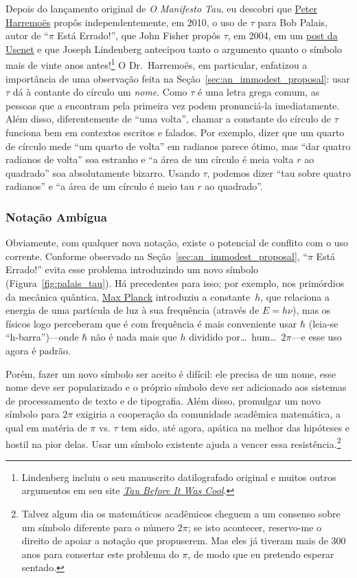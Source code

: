 Depois do lançamento original de \emph{O Manifesto Tau}, eu descobri que \href{http://www.harremoes.dk/Peter/}{Peter Harremo\"{e}s} propôs independentemente, em 2010, o uso de $\tau$ para Bob Palais, autor de ``$\pi$ Está Errado!'', que John Fisher propôs $\tau$, em 2004, em um \href{https://groups.google.com/forum/#!msg/sci.math/c-DHmJHSA0A/sLCoOtHB1UAJ}{post da Usenet} e que Joseph Lindenberg antecipou tanto o argumento quanto o símbolo mais de vinte anos antes!\footnote{Lindenberg incluiu o seu manuscrito datilografado original e muitos outros argumentos em seu site \href{https://sites.google.com/site/taubeforeitwascool/}{\emph{Tau Before It Was Cool}}.} O Dr.~Harremo\"{e}s, em particular, enfatizou a importância de uma observação feita na Seção~\ref{sec:an_immodest_proposal}: usar $\tau$ dá à contante do círculo um \emph{nome}. Como $\tau$ é uma letra grega comum, as pessoas que a encontram pela primeira vez podem pronunciá-la imediatamente. Além disso, diferentemente de ``uma volta'', chamar a constante do círculo de $\tau$ funciona bem em contextos escritos e falados. Por exemplo, dizer que um quarto de círculo mede ``um quarto de volta'' em radianos parece ótimo, mas ``dar quatro radianos de volta'' soa estranho e ``a área de um círculo é meia volta $r$ ao quadrado'' soa absolutamente bizarro. Usando $\tau$, podemos dizer ``tau sobre quatro radianos'' e ``a área de um círculo é meio tau $r$ ao quadrado''.

    \subsubsection{Notação Ambígua} %
    \label{sec:ambiguous_notation}


Obviamente, com qualquer nova notação, existe o potencial de conflito com o uso corrente. Conforme observado na Seção~\ref{sec:an_immodest_proposal}, ``$\pi$ Está Errado!'' evita esse problema introduzindo um novo símbolo (Figura~\ref{fig:palais_tau}). Há precedentes para isso; por exemplo, nos primórdios da mecânica quântica, \href{https://pt.wikipedia.org/wiki/Max_Planck}{Max Planck} introduziu a constante~$h$, que relaciona a energia de uma partícula de luz à sua frequência (através de $E = h\nu$), mas os físicos logo perceberam que é com frequência é mais conveniente usar $\hbar$ (leia-se ``h-barra'')---onde $\hbar$ não é nada mais que $h$ dividido por\ldots\ hum\ldots\ $2\pi$---e esse uso agora é padrão.

Porém, fazer um novo símbolo ser aceito é difícil: ele precisa de um nome, esse nome deve ser popularizado e o próprio símbolo deve ser adicionado aos sistemas de processamento de texto e de tipografia. Além disso, promulgar um novo símbolo para $2\pi$ exigiria a cooperação da comunidade acadêmica matemática, a qual em matéria de $\pi$ vs. $\tau$ tem sido, até agora, apática na melhor das hipóteses e hostil na pior delas. Usar um símbolo existente ajuda a vencer essa resistência.\footnote{Talvez algum dia os matemáticos acadêmicos cheguem a um consenso sobre um símbolo diferente para o número $2\pi$; se isto acontecer, reservo-me o direito de apoiar a notação que propuserem. Mas eles já tiveram mais de 300 anos para consertar este problema do $\pi$, de modo que eu pretendo esperar sentado.}


